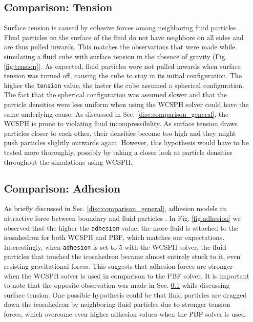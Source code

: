\documentclass[11pt, letterpaper, twocolumn]{article}
\begin{document}
\subsection{Comparison: Tension}
\label{disc:comparison_tension}
Surface tension is caused by cohesive forces among neighboring fluid particles \cite{akinci2013}. Fluid particles on the surface of the fluid do not have neighbors on all sides and are thus pulled inwards. This matches the observations that were made while simulating a fluid cube with surface tension in the absence of gravity (Fig. \ref{fig:tension}).
As expected, fluid particles were not pulled inwards when surface tension was turned off, causing the cube to stay in its initial configuration. The higher the \texttt{tension} value, the faster the cube assumed a spherical configuration. The fact that the spherical configuration was assumed slower and that the particle densities were less uniform
when using the WCSPH solver could have the same underlying cause: As discussed in Sec. \ref{disc:comparison_general}, the WCSPH is prone to violating fluid incompressibility. As surface tension draws particles closer to each other, their densities become too high and they might push particles slightly outwards again. However, this hypothesis would 
have to be tested more thoroughly, possibly by taking a closer look at particle densities throughout the simulations using WCSPH. 

\subsection{Comparison: Adhesion}
\label{disc:comparison_adhesion}
As briefly discussed in Sec. \ref{disc:comparison_general}, adhesion models an attractive force between boundary and fluid particles \cite{akinci2013}. In Fig. \ref{fig:adhesion} we observed that the higher the \texttt{adhesion} value, the more fluid is attached to the icosahedron for both WCSPH and PBF, which matches our expectations. 
Interestingly, when \texttt{adhesion} is set to 5 with the WCSPH solver, the fluid particles that touched the icosahedron became almost entirely stuck to it, even resisting gravitational forces. This suggests that adhesion forces are stronger when the WCSPH solver is used in comparison to the PBF solver. It is important to note that the opposite observation
was made in Sec. \ref{disc:comparison_tension} while discussing surface tension. One possible hypothesis could be that fluid particles are dragged down the icosahedron by neighboring fluid particles due to stronger tension forces, which overcome even higher adhesion values when the PBF solver is used. 
\end{document}
